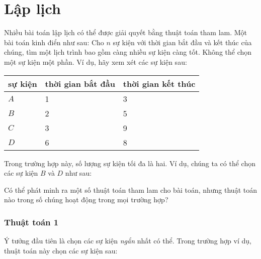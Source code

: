 \section{Lập lịch}

Nhiều bài toán lập lịch có thể được giải quyết
bằng thuật toán tham lam.
Một bài toán kinh điển như sau:
Cho $n$ sự kiện với thời gian bắt đầu và kết thúc của chúng,
tìm một lịch trình
bao gồm càng nhiều sự kiện càng tốt.
Không thể chọn một sự kiện một phần.
Ví dụ, hãy xem xét các sự kiện sau:
\begin{center}
\begin{tabular}{lll}
sự kiện & thời gian bắt đầu & thời gian kết thúc \\
\hline
$A$ & 1 & 3 \\
$B$ & 2 & 5 \\
$C$ & 3 & 9 \\
$D$ & 6 & 8 \\
\end{tabular}
\end{center}
Trong trường hợp này, số lượng sự kiện tối đa là hai.
Ví dụ, chúng ta có thể chọn các sự kiện $B$ và $D$
như sau:
\begin{center}
\end{center}

Có thể phát minh ra một số thuật toán tham lam
cho bài toán, nhưng thuật toán nào trong số chúng hoạt động trong mọi trường hợp?

\subsubsection*{Thuật toán 1}

Ý tưởng đầu tiên là chọn các sự kiện \emph{ngắn}
nhất có thể.
Trong trường hợp ví dụ, thuật toán này
chọn các sự kiện sau:
\begin{center}
\end{center}

